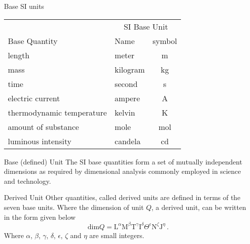\documentclass[avery5371,grid]{flashcards}
\begin{document}
\begin{flashcard}[Definitions]{Base SI units}
\vspace{\fill}\small
\begin{center}
\begin{tabular}{llc}
    \toprule
                  & \multicolumn{2}{c}{SI Base Unit} \\
    Base Quantity & Name & symbol \\
    \midrule
    length  & meter     & m \\
    mass    & kilogram  & kg \\
    time    & second    & s \\
    electric current            & ampere    & A \\
    thermodynamic temperature   & kelvin    & K \\
    amount of substance         & mole      & mol \\
    luminous intensity          & candela   & cd \\
    \bottomrule
\end{tabular}
\end{center}
\vspace{\fill}
\end{flashcard}

\begin{flashcard}[Definitions]{Base (defined) Unit}
\vspace{\fill}
The SI base quantities form a set of mutually independent dimensions as required by dimensional analysis commonly employed in science and technology.
\vspace{\fill}
\end{flashcard}

\begin{flashcard}[Definitions]{Derived Unit}
\vspace{\fill}
Other quantities, called derived units are defined in terms of the seven base units.
Where the dimension of unit $Q$, a derived unit, can be written in the form given below
\begin{equation*}
    \mathrm{dim} Q = \mathrm{L}^{\alpha} \mathrm{M}^{\beta} \mathrm{T}^{\gamma} \mathrm{I}^{\delta} \Theta^{\epsilon} \mathrm{N}^{\zeta} \mathrm{J}^{\eta} \, .
\end{equation*}
Where $\alpha$, $\beta$, $\gamma$, $\delta$, $\epsilon$, $\zeta$ and $\eta$ are small integers.
\vspace{\fill}
\end{flashcard}
\end{document}
